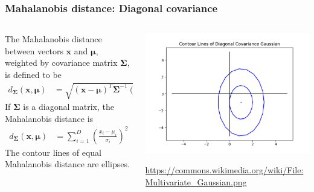 \documentclass{beamer}
\begin{document}
\begin{frame}
  \frametitle{Mahalanobis distance: Diagonal covariance}

  \begin{columns}
    \begin{column}{0.5\textwidth}
      The Mahalanobis distance between vectors $\mathbf{x}$ and
      $\bm{\mu}$, weighted by covariance matrix $\mathbf{\Sigma}$, is defined to be
      \begin{align*}
        d_{\mathbf{\Sigma}}(\mathbf{x},\bm{\mu}) &=
        \sqrt{(\mathbf{x}-\bm{\mu})^T\mathbf{\Sigma}^{-1}(\mathbf{x}-\bm{\mu})}
      \end{align*}
      If $\mathbf{\Sigma}$ is a diagonal matrix, the Mahalanobis distance is 
      \begin{align*}
        d_{\mathbf{\Sigma}}(\mathbf{x},\bm{\mu}) &=
        \sum_{i=1}^D\left(\frac{x_i-\mu_i}{\sigma_i}\right)^2
      \end{align*}
      The contour lines of equal Mahalanobis distance are ellipses.
    \end{column}
    \begin{column}{0.5\textwidth}
      \centerline{\includegraphics[width=\textwidth]{figs/contours_diagonal.png}}

      \url{https://commons.wikimedia.org/wiki/File:Multivariate_Gaussian.png}
    \end{column}
  \end{columns}
\end{frame}
\end{document}
